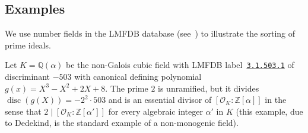 \documentclass{article}
\def\Z{{\mathbb Z}}
\def\Q{{\mathbb Q}}
\def\OO{{\mathcal O}}
\def\p{{\mathfrak p}}
\DeclareMathOperator{\disc}{disc}
\DeclareMathOperator{\ord}{ord}
\begin{document}
%
%
%

\subsection{Examples}
We use number fields in the LMFDB database (see~\cite{lmfdb}) to
illustrate the sorting of prime ideals.

Let $K=\Q(\alpha)$ be the non-Galois cubic field with LMFDB
label~\href{www.lmfdb.org/NumberField/3.1.503.1}{\texttt{3.1.503.1}}
of discriminant $-503$ with canonical defining polynomial
$g(x)=X^3-X^2+2X+8$.  The prime $2$ is unramified, but it divides
$\disc(g(X))=-2^2\cdot 503$ and is an essential divisor of
$[\OO_K:\Z[\alpha]]$ in the sense that $2\mid[\OO_K:\Z[\alpha']]$ for
every algebraic integer $\alpha'$ in $K$ (this example, due to
Dedekind, is the standard example of a non-monogenic field).
\end{document}
